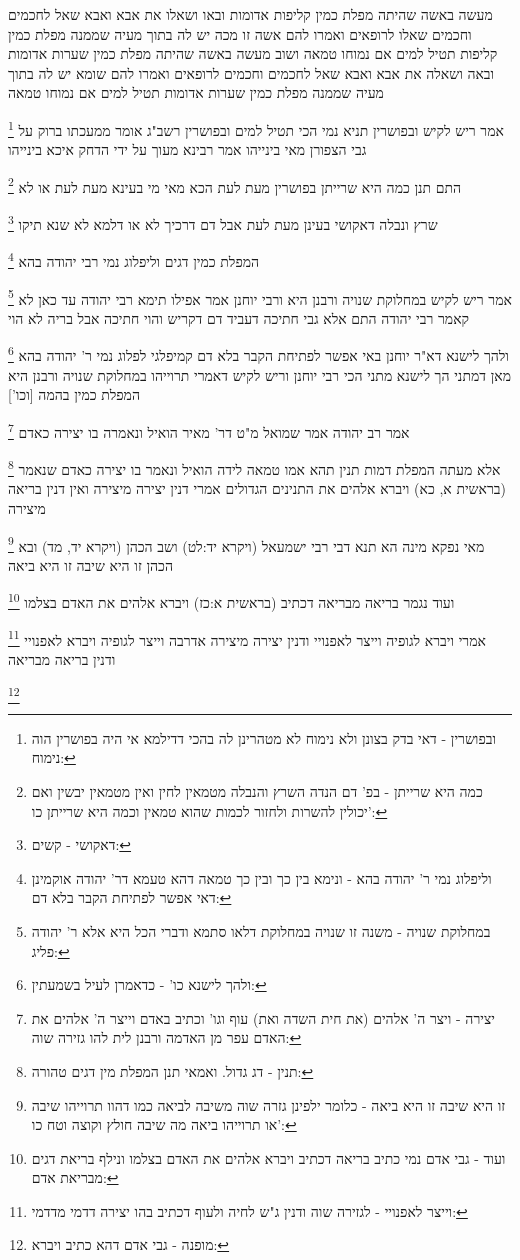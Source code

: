 \documentclass[12pt, openany]{book}
\newcommand{\footnotecomment}[1]{
	\renewcommand\thefootnote{}
	\footnote{#1}}
\newcommand{\commenta}[1]{\footnotecomment{#1}}
\begin{document}
{{מעשה באשה שהיתה מפלת כמין קליפות אדומות ובאו ושאלו את אבא ואבא שאל לחכמים וחכמים שאלו לרופאים ואמרו להם אשה זו מכה יש לה בתוך מעיה שממנה מפלת כמין קליפות תטיל למים אם נמוחו טמאה 
ושוב מעשה באשה שהיתה מפלת כמין שערות אדומות ובאה ושאלה את אבא ואבא שאל לחכמים וחכמים לרופאים ואמרו להם שומא יש לה בתוך מעיה שממנה מפלת כמין שערות אדומות תטיל למים אם נמוחו טמאה 
\commenta{ובפושרין - דאי בדק בצונן ולא נימוח לא מטהרינן לה בהכי דדילמא אי היה בפושרין הוה נימוח:}
אמר ריש לקיש ובפושרין תניא נמי הכי תטיל למים ובפושרין רשב"ג אומר ממעכתו ברוק על גבי הצפורן מאי בינייהו אמר רבינא מעוך על ידי הדחק איכא בינייהו 
\commenta{כמה היא שרייתן - בפ' דם הנדה השרץ והנבלה מטמאין לחין ואין מטמאין יבשין ואם יכולין להשרות ולחזור לכמות שהוא טמאין וכמה היא שרייתן כו':}
התם תנן כמה היא שרייתן בפושרין מעת לעת הכא מאי מי בעינא מעת לעת או לא 
\commenta{דאקושי - קשים:}
שרץ ונבלה דאקושי בעינן מעת לעת אבל דם דרכיך לא או דלמא לא שנא תיקו
\commenta{וליפלוג נמי ר' יהודה בהא - ונימא בין כך ובין כך טמאה דהא טעמא דר' יהודה אוקמינן דאי אפשר לפתיחת הקבר בלא דם:}
המפלת כמין דגים וליפלוג נמי רבי יהודה בהא 
\commenta{במחלוקת שנויה - משנה זו שנויה במחלוקת דלאו סתמא ודברי הכל היא אלא ר' יהודה פליג:}
אמר ריש לקיש במחלוקת שנויה ורבנן היא ורבי יוחנן אמר אפילו תימא רבי יהודה עד כאן לא קאמר רבי יהודה התם אלא גבי חתיכה דעביד דם דקריש והוי חתיכה אבל בריה לא הוי 
\commenta{ולהך לישנא כו' - כדאמרן לעיל בשמעתין:}
ולהך לישנא דא"ר יוחנן באי אפשר לפתיחת הקבר בלא דם קמיפלגי לפלוג נמי ר' יהודה בהא 
מאן דמתני הך לישנא מתני הכי רבי יוחנן וריש לקיש דאמרי תרוייהו במחלוקת שנויה ורבנן היא
המפלת כמין בהמה [וכו']
\commenta{יצירה - ויצר ה' אלהים (את חית השדה ואת) עוף וגו' וכתיב באדם וייצר ה' אלהים את האדם עפר מן האדמה ורבנן לית להו גזירה שוה:}
אמר רב יהודה אמר שמואל מ"ט דר' מאיר הואיל ונאמרה בו יצירה כאדם 
\commenta{תנין - דג גדול. ואמאי תנן המפלת מין דגים טהורה:}
אלא מעתה המפלת דמות תנין תהא אמו טמאה לידה הואיל ונאמר בו יצירה כאדם שנאמר (בראשית א, כא) ויברא אלהים את התנינים הגדולים 
אמרי דנין יצירה מיצירה ואין דנין בריאה מיצירה 
\commenta{זו היא שיבה זו היא ביאה - כלומר ילפינן גזרה שוה משיבה לביאה כמו דהוו תרוייהו שיבה או תרוייהו ביאה מה שיבה חולץ וקוצה וטח כו':}
מאי נפקא מינה הא תנא דבי רבי ישמעאל (ויקרא יד:לט) ושב הכהן (ויקרא יד, מד) ובא הכהן זו היא שיבה זו היא ביאה 
\commenta{ועוד - גבי אדם נמי כתיב בריאה דכתיב ויברא אלהים את האדם בצלמו ונילף בריאת דגים מבריאת אדם:}
ועוד נגמר בריאה מבריאה דכתיב (בראשית א:כז) ויברא אלהים את האדם בצלמו 
\commenta{וייצר לאפנויי - לגזירה שוה ודנין ג"ש לחיה ולעוף דכתיב בהו יצירה דדמי מדדמי:}
אמרי ויברא לגופיה וייצר לאפנויי ודנין יצירה מיצירה 
אדרבה וייצר לגופיה ויברא לאפנויי ודנין בריאה מבריאה 
\commenta{מופנה - גבי אדם דהא כתיב ויברא:}
}}
\end{document}
